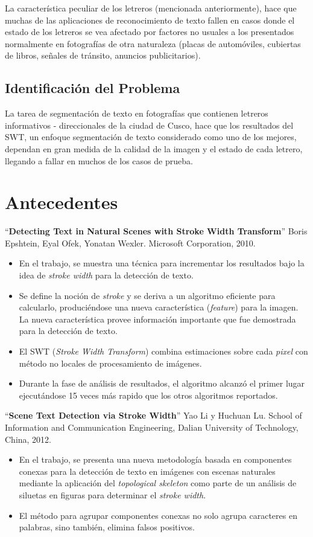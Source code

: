 La característica peculiar de los letreros (mencionada anteriormente), hace que 
muchas de las aplicaciones de reconocimiento de texto fallen en casos donde el 
estado de los letreros se vea afectado por factores no usuales a los presentados
normalmente en fotografías de otra naturaleza (placas de automóviles, cubiertas 
de libros, señales de tránsito, anuncios publicitarios). 

\subsection{Identificación del Problema}
La tarea de segmentación de texto en fotografías que contienen letreros
informativos - direccionales de la ciudad de Cusco, hace que los resultados del
SWT, un enfoque segmentación de texto considerado como uno de los mejores, 
dependan en gran medida de la calidad de la imagen y el estado de cada letrero, 
llegando a fallar en muchos de los casos de prueba.

\section{Antecedentes}
``\textbf{Detecting Text in Natural Scenes with Stroke Width Transform}'' Boris
Epshtein, Eyal Ofek, Yonatan Wexler. Microsoft Corporation,
2010.\cite{Epshtein:SWT:2010}
\begin{itemize}
	\item En el trabajo, se muestra una técnica para incrementar los resultados
bajo la idea de \textit{stroke width} para la detección de texto.
	\item Se define la noción de \textit{stroke} y se deriva a un algoritmo
eficiente para calcularlo, produciéndose una nueva característica
(\textit{feature}) para la imagen. La nueva característica provee información
importante que fue demostrada para la detección de texto.
	\item El SWT (\textit{Stroke Width Transform}) combina estimaciones sobre cada
\textit{pixel} con método no locales de procesamiento de imágenes.
	\item Durante la fase de análisis de resultados, el algoritmo alcanzó el
primer lugar ejecutándose 15 veces más rapido que los otros algoritmos
reportados.
\end{itemize}

``\textbf{Scene Text Detection via Stroke Width}'' Yao Li y Huchuan Lu. School
of Information and Communication Engineering, Dalian University of Technology,
China, 2012. \cite{li:2012:scene}
\begin{itemize}
	\item En el trabajo, se presenta una nueva metodología basada en componentes
conexas para la detección de texto en imágenes con escenas naturales mediante la
aplicación del \textit{topological skeleton} como parte de un análisis de
siluetas en figuras para determinar el \textit{stroke width}.
	\item El método para agrupar componentes conexas no solo agrupa
caracteres en palabras, sino también, elimina falsos positivos.
\end{itemize}


